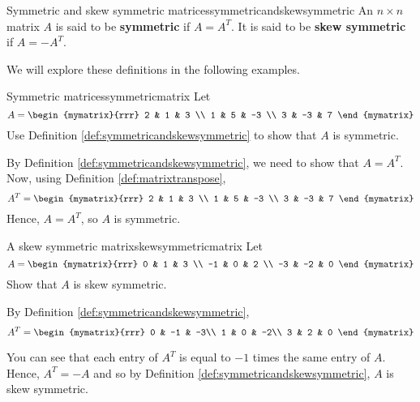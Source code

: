 \begin{definition}{Symmetric and skew symmetric matrices}{symmetricandskewsymmetric}
An $n\times n$ matrix $A$ is said to be
\textbf{symmetric} if $A=A^{T}.$ It is said to be
\textbf{skew symmetric} if $A=-A^{T}.$
\end{definition}

We will explore these definitions in the following examples.

\begin{example}{Symmetric matrices}{symmetricmatrix}
Let
\begin{equation*}
A=\begin{mymatrix}{rrr}
2 & 1 & 3 \\
1 & 5 & -3 \\
3 & -3 & 7
\end{mymatrix} 
\end{equation*}
Use Definition \ref{def:symmetricandskewsymmetric} to show that $A$ is symmetric. 
\end{example}

\begin{solution}
By Definition \ref{def:symmetricandskewsymmetric}, we need to show that $A = A^T$. 
Now, using Definition \ref{def:matrixtranspose}, 
\begin{equation*}
A^{T} = \begin{mymatrix}{rrr}
2 & 1 & 3 \\
1 & 5 & -3 \\
3 & -3 & 7
\end{mymatrix}
\end{equation*}
Hence, $A = A^{T}$, so $A$ is symmetric.
\end{solution}

\begin{example}{A skew symmetric matrix}{skewsymmetricmatrix}
Let
\begin{equation*}
A=\begin{mymatrix}{rrr}
0 & 1 & 3 \\
-1 & 0 & 2 \\
-3 & -2 & 0
\end{mymatrix} 
\end{equation*}
Show that $A$ is skew symmetric.
\end{example}

\begin{solution} By Definition \ref{def:symmetricandskewsymmetric}, 
\begin{equation*}
A^{T} = \begin{mymatrix}{rrr}
0 & -1 & -3\\
1 &  0 & -2\\
3 &  2 &  0
\end{mymatrix} 
\end{equation*}

You can see that each entry of $A^T$ is equal to $-1$ times the same entry of $A$. 
Hence, $A^{T} = - A$ and so by Definition \ref{def:symmetricandskewsymmetric}, $A$ is skew symmetric. 
\end{solution}
